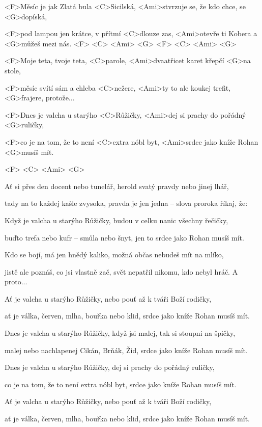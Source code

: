 

\zs
<F>Měsíc je jak Zlatá bula <C>Sicilská,
<Ami>stvrzuje se, že kdo chce, se <G>dopíská,

<F>pod lampou jen krátce, v přítmí <C>dlouze zas,
<Ami>otevře ti Kobera a <G>můžeš mezi nás.
<F> <C> <Ami> <G> <F> <C> <Ami> <G>
\ks

\zs
<F>Moje teta, tvoje teta, <C>parole,
<Ami>dvaatřicet karet křepčí <G>na stole,

<F>měsíc svítí sám a chleba <C>nežere,
<Ami>ty to ale koukej trefit, <G>frajere, protože...
\ks

\zr
<F>Dnes je valcha u starýho <C>Růžičky,
<Ami>dej si prachy do pořádný <G>ruličky,

<F>co je na tom, že to není <C>extra nóbl byt,
<Ami>srdce jako kníže Rohan <G>musíš mít.

<F> <C> <Ami> <G>
\kr

\zs
Ať si přes den docent nebo tunelář,
herold svatý pravdy nebo jinej lhář,

tady na to každej kašle zvysoka,
pravda je jen jedna -- slova proroka říkaj, že:
\ks

\zr
Když je valcha u starýho Růžičky,
budou v celku nanic všechny řečičky,

buďto trefa nebo kufr -- smůla nebo šnyt,
jen to srdce jako Rohan musíš mít.
\kr

\zs
Kdo se bojí, má jen hnědý kaliko,
možná občas nebudeš mít na mlíko,

jistě ale poznáš, co jsi vlastně zač,
svět nepatřil nikomu, kdo nebyl hráč.
A proto...
\ks

\zr
Ať je valcha u starýho Růžičky,
nebo pouť až k tváři Boží rodičky,

ať je válka, červen, mlha, bouřka nebo klid,
srdce jako kníže Rohan musíš mít.
\kr

\zr
Dnes je valcha u starýho Růžičky,
když jsi malej, tak si stoupni na špičky,

malej nebo nachlapenej Cikán, Brňák, Žid,
srdce jako kníže Rohan musíš mít.
\kr

\zr
Dnes je valcha u starýho Růžičky,
dej si prachy do pořádný ruličky,

co je na tom, že to není extra nóbl byt,
srdce jako kníže Rohan musíš mít.
\kr

\zr
Ať je valcha u starýho Růžičky,
nebo pouť až k tváři Boží rodičky,

ať je válka, červen, mlha, bouřka nebo klid,
srdce jako kníže Rohan musíš mít.
\kr

\kp
